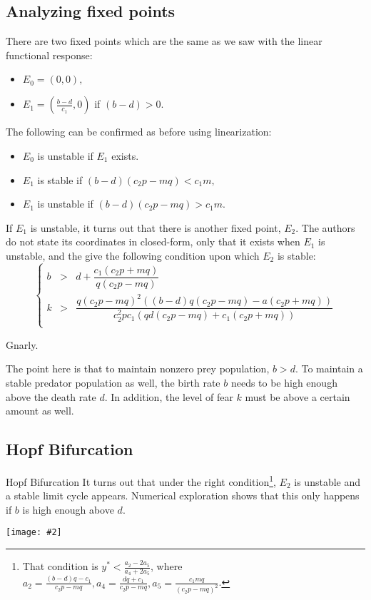 \documentclass{beamer}
\newcommand{\jpg}[2]{\begin{center}\texttt{[image: \#2]}\end{center}}
\begin{document}
\subsection{Analyzing fixed points}
\begin{frame}
There are two fixed points which are the same as we saw with the linear functional response:
\begin{itemize}
\item $E_0 = (0,0),$
\item $E_1 = \left(\frac{b-d}{c_1}, 0\right)$ if $(b-d)>0.$
\end{itemize}
The following can be confirmed as before using linearization: 
\begin{itemize}
\item $E_0$ is unstable if $E_1$ exists. 
\item $E_1$ is stable if $(b-d)(c_2p-mq)<c_1m,$
\item $E_1$ is unstable if $(b-d)(c_2p-mq)>c_1m.$
\end{itemize}
\end{frame}
\begin{frame}
If $E_1$ is unstable, it turns out that there is another fixed point, $E_2$. The authors do not state its coordinates in closed-form, only that it exists when $E_1$ is unstable, and the give the following condition upon which $E_2$ is stable:
\[\left\lbrace\begin{array}{rcl}
b&>&d+\dfrac{c_1(c_2p+mq)}{q(c_2p-mq)}\\
k&>&\dfrac{q(c_2p-mq)^2((b-d)q(c_2p-mq)-a(c_2p+mq))}{c_2^2pc_1(qd(c_2p-mq)+c_1(c_2p+mq))}\\
\end{array}\right.\]
\begin{center}
 Gnarly. 
\end{center}
The point here is that to maintain nonzero prey population, $b>d$. To maintain a stable predator population as well, the birth rate $b$ needs to be high enough above the death rate $d$. In addition, the level of fear $k$ must be above a certain amount as well.
\end{frame}
\subsection{Hopf Bifurcation}
\begin{frame}{Hopf Bifurcation}
It turns out that under the right condition\footnote{That condition is $y^*<\frac{a_2-2a_5}{a_4+2a_5}$, where $a_2=\frac{(b-d)q-c_1}{c_2p-mq}, a_4=\frac{dq+c_1}{c_2p-mq}, a_5=\frac{c_1mq}{(c_2p-mq)^2}$.}, $E_2$ is unstable and a stable limit cycle appears. Numerical exploration shows that this only happens if $b$ is high enough above $d$. 
\jpg{width=0.66\textwidth}{hopf_graph_1}
\end{frame}
\end{document}
